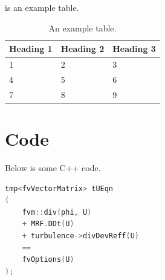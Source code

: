 \documentclass{article}
\begin{document}
	 is an example table.

	\begin{table}[h!]
		\caption{An example table.}
		\label{tabletest}
		\begin{center}
  			\begin{tabularx}{\textwidth}{ X X X }
    				\toprule
    				Heading 1 & Heading 2 & Heading 3 \\ 
    				\midrule
    				1 & 2 & 3 \\ 
    				4 & 5 & 6 \\ 
    				7 & 8 & 9 \\
    				\bottomrule
  			\end{tabularx}
		\end{center}
	\end{table}

	\section{Code}
	Below is some C++ code.
	\begin{lstlisting}[language=C++]
tmp<fvVectorMatrix> tUEqn
(
	fvm::div(phi, U)
	+ MRF.DDt(U)
	+ turbulence->divDevReff(U)
	==
	fvOptions(U)
);
\end{lstlisting}
   
	
	
	\label{bibsect}
\end{document}
